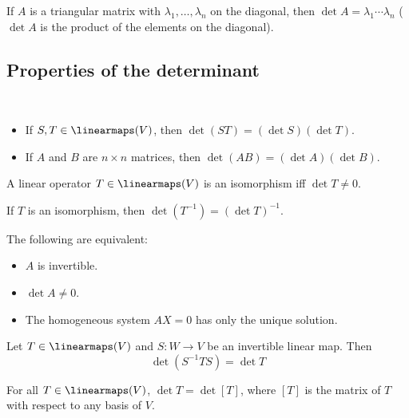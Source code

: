 \begin{lemma}
  If $A$ is a triangular matrix with $\lambda_1, \ldots, \lambda_n$ on the diagonal, then $\det A = \lambda_1 \cdots \lambda_n$ ($\det A$ is the product of the elements on the diagonal).
\end{lemma}

\subsection{Properties of the determinant}

\begin{theorem} \ \\
  \begin{itemize}
    \item If $S, T \in \linearmaps(V)$, then $\det(ST) = (\det S)(\det T)$.
    \item If $A$ and $B$ are $n \times n$ matrices, then $\det(AB) = (\det A)(\det B)$.
  \end{itemize}
\end{theorem}

\begin{theorem}
  A linear operator $T \in \linearmaps(V)$ is an isomorphism iff $\det T \neq 0$.

  If $T$ is an isomorphism, then $\det(T^{-1}) = (\det T)^{-1}$.
\end{theorem}

\begin{theorem}
  The following are equivalent:
  \begin{itemize}
    \item $A$ is invertible.
    \item $\det A \neq 0$.
    \item The homogeneous system $AX = 0$ has only the unique solution.
  \end{itemize}
\end{theorem}

\begin{theorem}
  Let $T \in \linearmaps(V)$ and $S : W \to V$ be an invertible linear map. Then
  \[
    \det(S^{-1} T S) = \det T
  \]
\end{theorem}

\begin{theorem}
  For all $T \in \linearmaps(V)$, $\det T = \det [T]$, where $[T]$ is the matrix of $T$ with respect to any basis of $V$.
\end{theorem}

